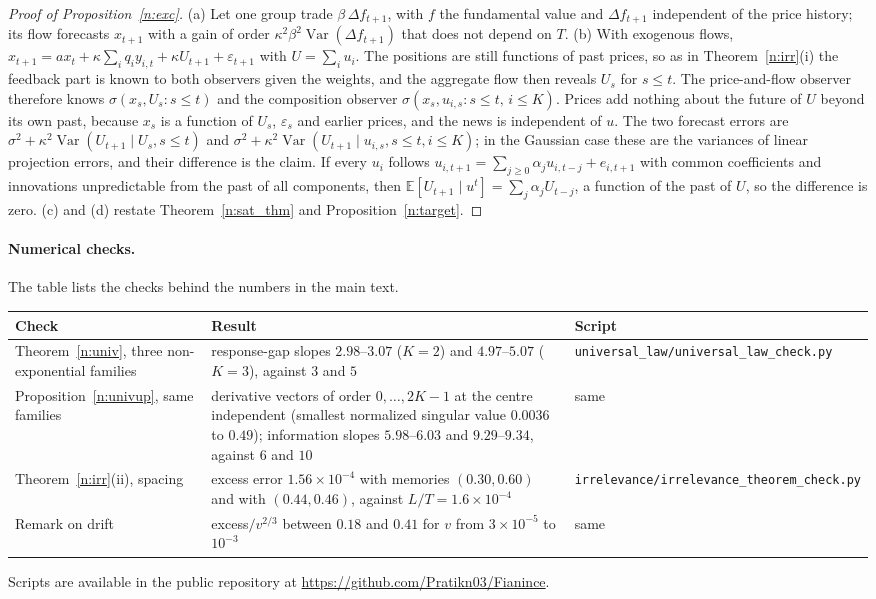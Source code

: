 \begin{proof}[Proof of Proposition~\ref{n:exc}]
(a) Let one group trade $\beta\,\Delta f_{t+1}$, with $f$ the fundamental value and $\Delta f_{t+1}$ independent of the price history; its flow forecasts $x_{t+1}$ with a gain of order $\kappa^2\beta^2\operatorname{Var}(\Delta f_{t+1})$ that does not depend on $T$. (b) With exogenous flows, $x_{t+1}=ax_t+\kappa\sum_iq_iy_{i,t}+\kappa U_{t+1}+\varepsilon_{t+1}$ with $U=\sum_iu_i$. The positions are still functions of past prices, so as in Theorem~\ref{n:irr}(i) the feedback part is known to both observers given the weights, and the aggregate flow then reveals $U_s$ for $s\le t$. The price-and-flow observer therefore knows $\sigma(x_s,U_s:s\le t)$ and the composition observer $\sigma(x_s,u_{i,s}:s\le t,\,i\le K)$. Prices add nothing about the future of $U$ beyond its own past, because $x_s$ is a function of $U_s$, $\varepsilon_s$ and earlier prices, and the news is independent of $u$. The two forecast errors are $\sigma^2+\kappa^2\operatorname{Var}(U_{t+1}\mid U_s,s\le t)$ and $\sigma^2+\kappa^2\operatorname{Var}(U_{t+1}\mid u_{i,s},s\le t,i\le K)$; in the Gaussian case these are the variances of linear projection errors, and their difference is the claim. If every $u_i$ follows $u_{i,t+1}=\sum_{j\ge0}\alpha_ju_{i,t-j}+e_{i,t+1}$ with common coefficients and innovations unpredictable from the past of all components, then $\mathbb E[U_{t+1}\mid u^t]=\sum_j\alpha_jU_{t-j}$, a function of the past of $U$, so the difference is zero. (c) and (d) restate Theorem~\ref{n:sat_thm} and Proposition~\ref{n:target}.
\end{proof}

\paragraph{Numerical checks.} The table lists the checks behind the numbers in the main text.

\begin{center}\small
\begin{tabular}{p{1.7in}p{2.6in}p{1.6in}}\toprule
Check & Result & Script \\\midrule
Theorem~\ref{n:univ}, three non-exponential families & response-gap slopes $2.98$--$3.07$ ($K=2$) and $4.97$--$5.07$ ($K=3$), against $3$ and $5$ & \nolinkurl{universal_law/universal_law_check.py}\\
Proposition~\ref{n:univup}, same families & derivative vectors of order $0,\ldots,2K-1$ at the centre independent (smallest normalized singular value $0.0036$ to $0.49$); information slopes $5.98$--$6.03$ and $9.29$--$9.34$, against $6$ and $10$ & same\\
Theorem~\ref{n:irr}(ii), spacing & excess error $1.56\times10^{-4}$ with memories $(0.30,0.60)$ and with $(0.44,0.46)$, against $L/T=1.6\times10^{-4}$ & \nolinkurl{irrelevance/irrelevance_theorem_check.py}\\
Remark on drift & excess$/v^{2/3}$ between $0.18$ and $0.41$ for $v$ from $3\times10^{-5}$ to $10^{-3}$ & same\\\bottomrule
\end{tabular}
\end{center}
\noindent Scripts are available in the public repository at \url{https://github.com/Pratikn03/Fianince}.
